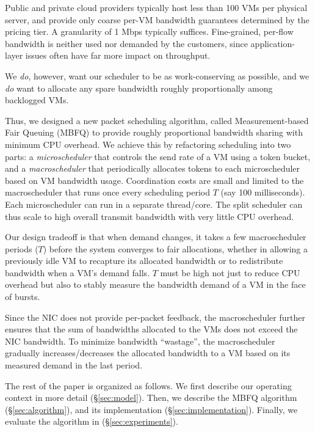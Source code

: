  Public and private
cloud providers typically host less than 100 VMs per physical server, and
provide only coarse per-VM bandwidth guarantees determined by the pricing tier.
A granularity of 1 Mbps typically suffices.  Fine-grained, per-flow bandwidth is
neither used nor demanded by the customers, since application-layer issues often
have far more impact on throughput.

We {\em do}, however, want our scheduler to be as work-conserving as possible,
and we {\em do} want to allocate any spare bandwidth roughly proportionally
among backlogged VMs.

Thus, we designed a new packet scheduling algorithm, called Measurement-based
Fair Queuing (MBFQ) to provide roughly proportional bandwidth sharing with
minimum CPU overhead. We achieve this by refactoring scheduling into two parts:
a {\em microscheduler} that controls the send rate of a VM using a token bucket,
and a {\em macroscheduler} that periodically allocates tokens to each
microscheduler based on VM bandwidth usage.  Coordination costs are small and
limited to the macroscheduler that runs once every scheduling period $T$ (say
100 milliseconds). Each microscheduler can run in a separate thread/core. The
split scheduler can thus scale to high overall transmit bandwidth with very
little CPU overhead.

Our design tradeoff is that when demand changes, it takes a few macroscheduler
periods ($T$) before the system converges to fair allocations, whether in
allowing a previously idle VM to recapture its allocated bandwidth or to
redistribute bandwidth when a VM's demand falls.  $T$  must be high not just to
reduce CPU overhead but also to stably measure the bandwidth demand of a VM in
the face of bursts.

Since the NIC does not provide per-packet feedback, the macroscheduler further
ensures that the sum of bandwidths allocated to the VMs does not exceed the NIC
bandwidth. To minimize bandwidth ``wastage'', the macroscheduler gradually
increases/decreases the allocated bandwidth to a VM based on its measured demand
in the last period. 

The rest of the paper is organized as follows. We first describe our operating
context in more detail (\S\ref{sec:model}). Then, we describe the MBFQ algorithm
(\S\ref{sec:algorithm}), and its implementation (\S\ref{sec:implementation}).
Finally, we evaluate the algorithm in (\S\ref{sec:experiments}). 


